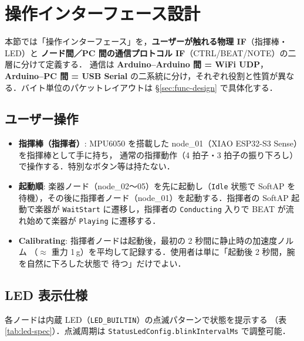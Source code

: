 \documentclass[lualatex,book,paper=a4paper,jafontsize=11.5pt,jafontscale=1.05]{jlreq}
\begin{document}
\section{操作インターフェース設計}\label{sec:basic-ui}

本節では「操作インターフェース」を，\textbf{ユーザーが触れる物理 IF}（指揮棒・LED）と
\textbf{ノード間／PC 間の通信プロトコル IF}（CTRL/BEAT/NOTE）の二層に分けて定義する．
通信は \textbf{Arduino--Arduino 間 = WiFi UDP}，\textbf{Arduino--PC 間 = USB Serial}
の二系統に分け，それぞれ役割と性質が異なる．バイト単位のパケットレイアウトは
\S\ref{sec:func-design} で具体化する．

\subsection{ユーザー操作}

\begin{itemize}
  \item \textbf{指揮棒（指揮者）}: MPU6050 を搭載した node\_01（XIAO ESP32-S3 Sense）を指揮棒として手に持ち，
        通常の指揮動作（4 拍子・3 拍子の振り下ろし）で操作する．特別なボタン等は持たない．
  \item \textbf{起動順}: 楽器ノード（node\_02〜05）を先に起動し（\texttt{Idle} 状態で
        SoftAP を待機），その後に指揮者ノード（node\_01）を起動する．指揮者の SoftAP
        起動で楽器が \texttt{WaitStart} に遷移し，指揮者の \texttt{Conducting} 入りで
        BEAT が流れ始めて楽器が \texttt{Playing} に遷移する．
  \item \textbf{Calibrating}: 指揮者ノードは起動後，最初の 2 秒間に静止時の加速度ノルム
        （$\approx$ 重力 1\,g）を平均して記録する．使用者は単に「起動後 2 秒間，腕を自然に下ろした状態で
        待つ」だけでよい．
\end{itemize}

\subsection{LED 表示仕様}

各ノードは内蔵 LED（\texttt{LED\_BUILTIN}）の点滅パターンで状態を提示する
（表 \ref{tab:led-spec}）．点滅周期は \texttt{StatusLedConfig.blinkIntervalMs} で調整可能．
\end{document}
